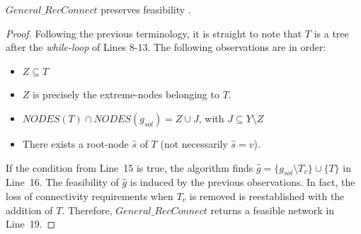 \begin{proposition}\label{g-r}
$General\_RecConnect$ preserves feasibility \cite{11}. 
\end{proposition}
\begin{proof}
Following the previous terminology, it is straight to note that $T$ is a tree after the 
\textit{while-loop} of Lines 8-13. The following observations are in order:
\begin{itemize}
\item $Z \subseteq T$
\item $Z$ is precisely the extreme-nodes belonging to $T$.
\item $NODES(T) \cap NODES(g_{sol}) = Z \cup J$, with $J \subseteq Y\setminus Z$
\item There exists a root-node $\hat{s}$ of $T$ (not necessarily $\hat{s}=v$). 
\end{itemize}
If the condition from Line~15 is true, the algorithm finds 
$\hat{g}= \{g_{sol} \setminus T_v\} \cup \{T\}$ in Line~16. 
The feasibility of $\hat{g}$ is induced by the previous observations. In fact, 
the loss of connectivity requirements when $T_v$ is removed is reestablished with the addition 
of $T$. Therefore, $General\_RecConnect$ returns a feasible network in Line~19.
\end{proof} 

